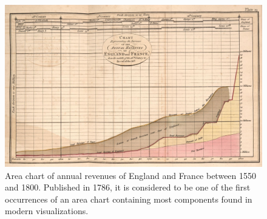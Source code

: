 \begin{figure}[tp]
\centering
\includegraphics[keepaspectratio,width=\linewidth,height=\thirdh]
{images/playfair-area-chart.png}
\caption[Area Chart by William Playfair from 1786]{%
Area chart of annual revenues of England and France between
1550 and 1800. Published in 1786, it is considered to be one of
the first occurrences of an area chart
containing most components found in modern visualizations.
}
\label{fig:PlayfairAreaChart}
\end{figure}










